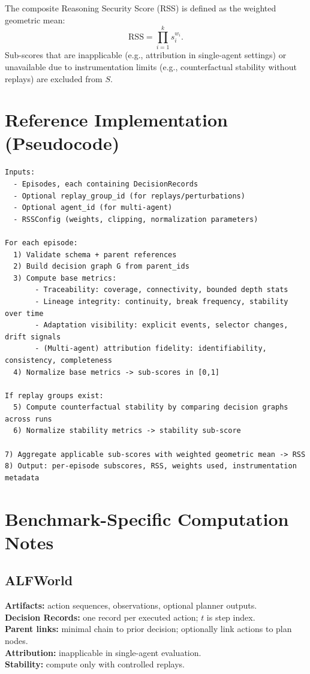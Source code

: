 \documentclass[11pt]{article}
\newcommand{\RSS}{\textsc{RSS}}
\begin{document}
The composite Reasoning Security Score (\RSS) is defined as the weighted geometric mean:
\[
\mathrm{RSS}=\prod_{i=1}^{k} s_i^{w_i}.
\]
Sub-scores that are inapplicable (e.g., attribution in single-agent settings) or unavailable due to instrumentation limits (e.g., counterfactual stability without replays) are excluded from $S$.

\section{Reference Implementation (Pseudocode)}
\label{app:pseudocode}

\begin{verbatim}
Inputs:
  - Episodes, each containing DecisionRecords
  - Optional replay_group_id (for replays/perturbations)
  - Optional agent_id (for multi-agent)
  - RSSConfig (weights, clipping, normalization parameters)

For each episode:
  1) Validate schema + parent references
  2) Build decision graph G from parent_ids
  3) Compute base metrics:
       - Traceability: coverage, connectivity, bounded depth stats
       - Lineage integrity: continuity, break frequency, stability over time
       - Adaptation visibility: explicit events, selector changes, drift signals
       - (Multi-agent) attribution fidelity: identifiability, consistency, completeness
  4) Normalize base metrics -> sub-scores in [0,1]

If replay groups exist:
  5) Compute counterfactual stability by comparing decision graphs across runs
  6) Normalize stability metrics -> stability sub-score

7) Aggregate applicable sub-scores with weighted geometric mean -> RSS
8) Output: per-episode subscores, RSS, weights used, instrumentation metadata
\end{verbatim}

\section{Benchmark-Specific Computation Notes}
\label{app:benchmarks}

\subsection{ALFWorld}
\textbf{Artifacts:} action sequences, observations, optional planner outputs. \\
\textbf{Decision Records:} one record per executed action; $t$ is step index. \\
\textbf{Parent links:} minimal chain to prior decision; optionally link actions to plan nodes. \\
\textbf{Attribution:} inapplicable in single-agent evaluation. \\
\textbf{Stability:} compute only with controlled replays.
\end{document}
